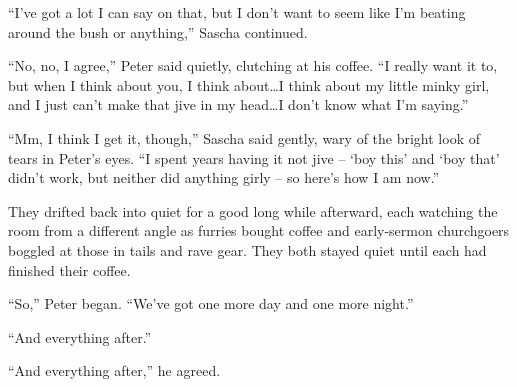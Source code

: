 ``I've got a lot I can say on that, but I don't want to seem like I'm beating around the bush or anything,'' Sascha continued.

``No, no, I agree,'' Peter said quietly, clutching at his coffee. ``I really want it to, but when I think about you, I think about\ldots{}I think about my little minky girl, and I just can't make that jive in my head\ldots{}I don't know what I'm saying.''

``Mm, I think I get it, though,'' Sascha said gently, wary of the bright look of tears in Peter's eyes. ``I spent years having it not jive -- `boy this' and `boy that' didn't work, but neither did anything girly -- so here's how I am now.''

They drifted back into quiet for a good long while afterward, each watching the room from a different angle as furries bought coffee and early-sermon churchgoers boggled at those in tails and rave gear. They both stayed quiet until each had finished their coffee.

``So,'' Peter began. ``We've got one more day and one more night.''

``And everything after.''

``And everything after,'' he agreed.
